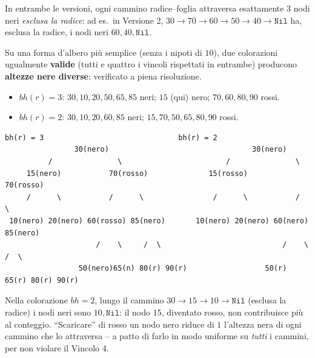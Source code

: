\documentclass[12pt, a4paper]{article}
\begin{document}
In entrambe le versioni, ogni cammino radice--foglia attraversa esattamente $3$ nodi neri \emph{esclusa la radice}: ad es.\ in Versione 2, $30\to70\to60\to50\to40\to\texttt{Nil}$ ha, esclusa la radice, i nodi neri $60,40,\texttt{Nil}$.

\begin{tcolorbox}[colback=lightergray!5, colframe=tocsubsec, title=\textbf{Cambiare Colorazione Può Cambiare l'Altezza Nera}]
Su una forma d'albero più semplice (senza i nipoti di $10$), due colorazioni ugualmente \textbf{valide} (tutti e quattro i vincoli rispettati in entrambe) producono \textbf{altezze nere diverse}: verificato a piena risoluzione.
\begin{itemize}
    \item $bh(r)=3$: $30,10,20,50,65,85$ neri; $15$ (qui) nero; $70,60,80,90$ rossi\footnotemark.
    \item $bh(r)=2$: $30,10,20,60,85$ neri; $15,70,50,65,80,90$ rossi.
\end{itemize}
\end{tcolorbox}

\begin{verbatim}
bh(r) = 3                               bh(r) = 2
                30(nero)                                 30(nero)
          /               \                        /               \
     15(nero)           70(rosso)              15(rosso)          70(rosso)
     /      \           /      \                /      \           /      \
 10(nero) 20(nero) 60(rosso) 85(nero)       10(nero) 20(nero) 60(nero)  85(nero)
                     /    \     /  \                            /    \     /  \
                 50(nero)65(n) 80(r) 90(r)                  50(r) 65(r) 80(r) 90(r)
\end{verbatim}

\begin{tcolorbox}[colback=lightergray!5, colframe=tocsubsec, title=\textbf{Perché Succede}]
Nella colorazione $bh=2$, lungo il cammino $30\to15\to10\to\texttt{Nil}$ (esclusa la radice) i nodi neri sono $10,\texttt{Nil}$: il nodo $15$, diventato rosso, non contribuisce più al conteggio. ``Scaricare'' di rosso un nodo nero riduce di $1$ l'altezza nera di ogni cammino che lo attraversa -- a patto di farlo in modo uniforme su \emph{tutti} i cammini, per non violare il Vincolo 4.
\end{tcolorbox}
\end{document}
